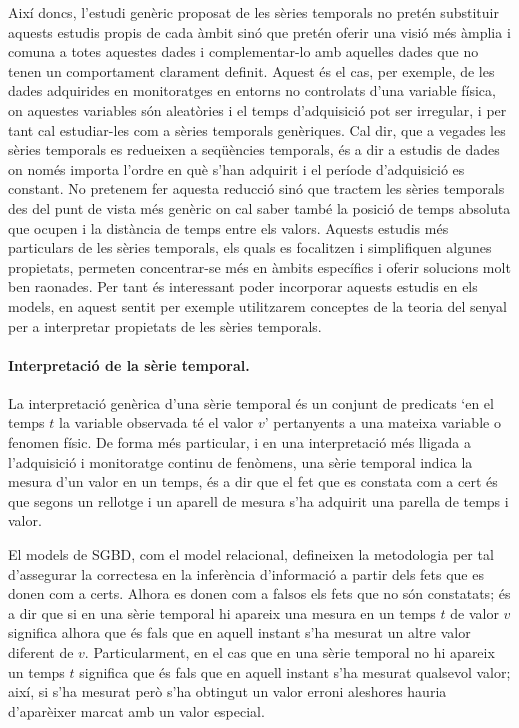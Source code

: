 


Així doncs, l'estudi genèric proposat de les sèries temporals no
pretén substituir aquests estudis propis de cada àmbit sinó que pretén
oferir una visió més àmplia i comuna a totes aquestes dades i
complementar-lo amb aquelles dades que no tenen un comportament
clarament definit. Aquest és el cas, per exemple, de les dades
adquirides en monitoratges en entorns no controlats d'una variable
física, on aquestes variables són aleatòries i el temps d'adquisició pot
ser irregular, i per tant cal estudiar-les com a sèries temporals
genèriques.  Cal dir, que a vegades les sèries temporals es redueixen
a seqüències temporals, és a dir a estudis de dades on només importa
l'ordre en què s'han adquirit i el període d'adquisició es
constant. No pretenem fer aquesta reducció sinó que tractem les sèries
temporals des del punt de vista més genèric on cal saber també la
posició de temps absoluta que ocupen i la distància de temps entre els
valors.  Aquests estudis més particulars de les sèries temporals, els
quals es focalitzen i simplifiquen algunes propietats, permeten
concentrar-se més en àmbits específics i oferir solucions molt ben
raonades.  Per tant és interessant poder incorporar aquests estudis en
els models, en aquest sentit per exemple utilitzarem conceptes de la
teoria del senyal per a interpretar propietats de les sèries
temporals.




\paragraph{Interpretació de la sèrie temporal.} 
La interpretació genèrica d'una sèrie temporal és un conjunt de
predicats `en el temps $t$ la variable observada té el valor $v$'
pertanyents a una mateixa variable o fenomen físic.  De forma més
particular, i en una interpretació més lligada a l'adquisició i
monitoratge continu de fenòmens, una sèrie temporal indica la mesura
d'un valor en un temps, és a dir que el fet que es constata com a cert
és que segons un rellotge i un aparell de mesura s'ha adquirit una
parella de temps i valor.  


El models de \gls{SGBD}, com el model relacional, defineixen la
metodologia per tal d'assegurar la correctesa en la inferència
d'informació a partir dels fets que es donen com a certs. Alhora es
donen com a falsos els fets que no són constatats; és a dir que si en
una sèrie temporal hi apareix una mesura en un temps $t$ de valor $v$
significa alhora que és fals que en aquell instant s'ha mesurat un
altre valor diferent de $v$. Particularment, en el cas que en una
sèrie temporal no hi apareix un temps $t$ significa que és fals que en
aquell instant s'ha mesurat qualsevol valor; així, si s'ha mesurat
però s'ha obtingut un valor erroni aleshores hauria d'aparèixer marcat
amb un valor especial.

